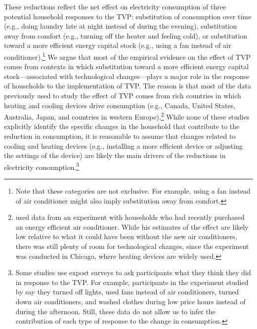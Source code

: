 \documentclass[12pt]{article}
\begin{document}
These reductions reflect the net effect on electricity consumption of three potential household responses to the TVP: substitution of consumption over time (e.g., doing laundry late at night instead of during the evening), substitution away from comfort (e.g., turning off the heater and feeling cold), or substitution toward a more efficient energy capital stock (e.g., using a fan instead of air conditioner).\footnote{Note that these categories are not exclusive. For example, using a fan instead of air conditioner might also imply substitution away from comfort.} We argue that most of the empirical evidence on the effect of TVP comes from contexts in which substitution toward a more efficient energy capital stock---associated with technological changes---plays a major role in the response of households to the implementation of TVP. The reason is that most of the data previously used to study the effect of TVP comes from rich countries in which heating and cooling devices drive consumption (e.g., Canada, United States, Australia, Japan, and countries in western Europe).\footnote{\citet{allcottRethinkingRealtimeElectricity2011} used data from an experiment with households who had recently purchased an energy efficient air conditioner. While his estimates of the effect are likely low relative to what it could have been without the new air conditioners, there was still plenty of room for technological changes, since the experiment was conducted in Chicago, where heating devices are widely used.}  While none of these studies explicitly identify the specific changes in the household that contribute to the reduction in consumption, it is reasonable to assume that changes related to cooling and heating devices (e.g., installing a more efficient device or adjusting the settings of the device) are likely the main drivers of the reductions in electricity consumption.\footnote{Some studies use expost surveys to ask participants what they think they did in response to the TVP. For example, participants in the experiment studied by \citet{allcottRethinkingRealtimeElectricity2011} say they turned off lights, used fans instead of air conditioners, turned down air conditioners, and washed clothes during low price hours instead of during the afternoon. Still, these data do not allow us to infer the contribution of each type of response to the change in consumption.}
\end{document}
